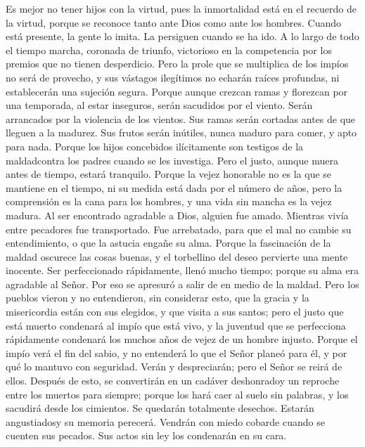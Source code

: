  Es mejor no tener hijos con la virtud, pues la
inmortalidad está en el recuerdo de la virtud, porque se reconoce tanto
ante Dios como ante los hombres.  Cuando está presente, la
gente lo imita. La persiguen cuando se ha ido. A lo largo de todo el
tiempo marcha, coronada de triunfo, victorioso en la competencia por los
premios que no tienen desperdicio.  Pero la prole que se
multiplica de los impíos no será de provecho, y sus vástagos ilegítimos
no echarán raíces profundas, ni establecerán una sujeción segura.
 Porque aunque crezcan ramas y florezcan por una
temporada, al estar inseguros, serán sacudidos por el viento. Serán
arrancados por la violencia de los vientos.  Sus ramas
serán cortadas antes de que lleguen a la madurez. Sus frutos serán
inútiles, nunca maduro para comer, y apto para nada. 
Porque los hijos concebidos ilícitamente son testigos de la maldadcontra
los padres cuando se les investiga.  Pero el justo, aunque
muera antes de tiempo, estará tranquilo.  Porque la vejez
honorable no es la que se mantiene en el tiempo, ni su medida está dada
por el número de años,  pero la comprensión es la cana
para los hombres, y una vida sin mancha es la vejez madura.
 Al ser encontrado agradable a Dios, alguien fue amado.
Mientras vivía entre pecadores fue transportado.  Fue
arrebatado, para que el mal no cambie su entendimiento, o que la astucia
engañe su alma.  Porque la fascinación de la maldad
oscurece las cosas buenas, y el torbellino del deseo pervierte una mente
inocente.  Ser perfeccionado rápidamente, llenó mucho
tiempo;  porque su alma era agradable al Señor. Por eso
se apresuró a salir de en medio de la maldad.  Pero los
pueblos vieron y no entendieron, sin considerar esto, que la gracia y la
misericordia están con sus elegidos, y que visita a sus santos;
 pero el justo que está muerto condenará al impío que
está vivo, y la juventud que se perfecciona rápidamente condenará los
muchos años de vejez de un hombre injusto.  Porque el
impío verá el fin del sabio, y no entenderá lo que el Señor planeó para
él, y por qué lo mantuvo con seguridad.  Verán y
despreciarán; pero el Señor se reirá de ellos. Después de esto, se
convertirán en un cadáver deshonradoy un reproche entre los muertos para
siempre;  porque los hará caer al suelo sin palabras, y
los sacudirá desde los cimientos. Se quedarán totalmente desechos.
Estarán angustiadosy su memoria perecerá.  Vendrán con
miedo cobarde cuando se cuenten sus pecados. Sus actos sin ley los
condenarán en su cara.

